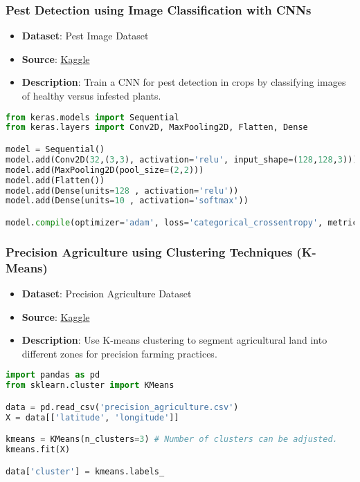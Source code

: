 \begin{frame}[fragile]\frametitle{Pest Detection using Image Classification with CNNs}
    \begin{itemize}
        \item \textbf{Dataset}: Pest Image Dataset
        \item \textbf{Source}: \href{https://www.kaggle.com/datasets/sarfaraz/pest-detection-dataset}{Kaggle}
        \item \textbf{Description}: Train a CNN for pest detection in crops by classifying images of healthy versus infested plants.
    \end{itemize}
    \begin{lstlisting}[language=Python]
from keras.models import Sequential
from keras.layers import Conv2D, MaxPooling2D, Flatten, Dense

model = Sequential()
model.add(Conv2D(32,(3,3), activation='relu', input_shape=(128,128,3)))
model.add(MaxPooling2D(pool_size=(2,2)))
model.add(Flatten())
model.add(Dense(units=128 , activation='relu'))
model.add(Dense(units=10 , activation='softmax'))

model.compile(optimizer='adam', loss='categorical_crossentropy', metrics=['accuracy'])
    \end{lstlisting}
\end{frame}

\begin{frame}[fragile]\frametitle{Precision Agriculture using Clustering Techniques (K-Means)}
    \begin{itemize}
        \item \textbf{Dataset}: Precision Agriculture Dataset
        \item \textbf{Source}: \href{https://www.kaggle.com/datasets/sagnik1511/precision-agriculture-data-set}{Kaggle}
        \item \textbf{Description}: Use K-means clustering to segment agricultural land into different zones for precision farming practices.
    \end{itemize}
    \begin{lstlisting}[language=Python]
import pandas as pd
from sklearn.cluster import KMeans

data = pd.read_csv('precision_agriculture.csv')
X = data[['latitude', 'longitude']]

kmeans = KMeans(n_clusters=3) # Number of clusters can be adjusted.
kmeans.fit(X)

data['cluster'] = kmeans.labels_
    \end{lstlisting}
\end{frame}

